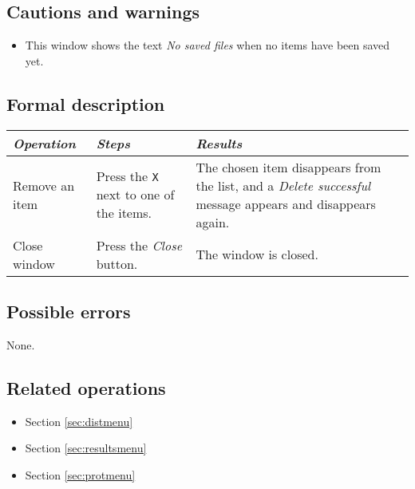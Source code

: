   \subsection*{Cautions and warnings}
  \begin{itemize}
  \item This window shows the text \emph{No saved files} when no items have been saved yet.
  \end{itemize}

  \subsection*{Formal description}
    \begin{tabularx}{\textwidth}{XXX}
    \toprule
    \emph{Operation} & \emph{Steps} & \emph{Results} \\
    \midrule
    Remove an item & Press the \texttt{X} next to one of the items. &  The chosen item disappears from the list, and a \emph{Delete successful} message appears and disappears again. \\
    \midrule
    Close window & Press the \emph{Close} button. & The window is closed. \\
    \bottomrule
\end{tabularx}

  \subsection*{Possible errors}
  None.

  \subsection*{Related operations}
   \begin{itemize}
   \item Section \ref{sec:distmenu}
   \item Section \ref{sec:resultsmenu}
   \item Section \ref{sec:protmenu}
  \end{itemize}
  
